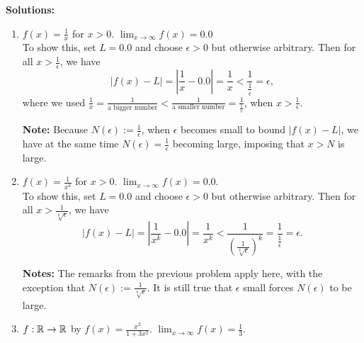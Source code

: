 \textbf{Solutions:}

\begin{enumerate}
\renewcommand{\labelenumi}{(\alph{enumi})}
\setlength{\itemsep}{.3cm}
    \item $f(x) = \frac{1}{x}$ for $x > 0$. \Ans $\displaystyle\lim_{x \to \infty} f(x) =0.0$\\
    
 To show this, set $L=0.0$ and choose $\epsilon >0$ but otherwise arbitrary. Then for all $x > \frac{1}{\epsilon}$, we have 
$$ |f(x) -L| = | \frac{1}{x} - 0.0|  = \frac{1}{x} < \frac{1}{\frac{1}{\epsilon}} = \epsilon,  $$
where we used $\frac{1}{x} =\frac{1}{\text{a bigger number}} < \frac{1}{\text{a smaller number}} = \frac{1}{\frac{1}{\epsilon}}$, when $\boxed{x > \frac{1}{\epsilon}}$.


\textbf{Note:} Because $N(\epsilon) := \frac{1}{\epsilon}$, when $\epsilon$ becomes small to bound $|f(x) -L|$, we have at the same time $N(\epsilon)=\frac{1}{\epsilon}$ becoming large, imposing that $x > N$ is large. 


      \item $f(x) = \frac{1}{x^k}$ for $x > 0$.   \Ans $\displaystyle\lim_{x \to \infty} f(x) =0.0$.\\

       To show this, set $L=0.0$ and choose $\epsilon >0$ but otherwise arbitrary. Then for all $x > \frac{1}{\sqrt[k]{\epsilon}}$, we have 
$$ |f(x) -L| = | \frac{1}{x^k} - 0.0|  = \frac{1}{x^k} < \frac{1}{\left(\frac{1}{\sqrt[k]{\epsilon}}\right)^k} = \frac{1}{\frac{1}{\epsilon}} = \epsilon .  $$

\textbf{Notes:} The remarks from the previous problem apply here, with the exception that $N(\epsilon):= \frac{1}{\sqrt[k]{\epsilon}}$. It is still true that $\epsilon$ small forces $N(\epsilon)$ to be large.

    
    \item $f:\mathbb R \to \mathbb R$ by $f(x) = \frac{x^2}{1 + 3 x^2}$. \Ans $\displaystyle\lim_{x \to \infty} f(x) =\frac{1}{3}$.\\


\end{enumerate}

